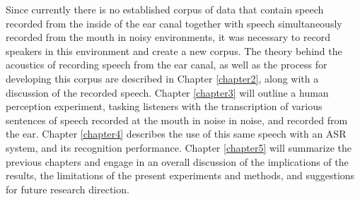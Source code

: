 Since currently there is no established corpus of data that contain speech recorded from the inside of the ear canal together with speech simultaneously recorded from the mouth in noisy environments, it was necessary to record speakers in this environment and create a new corpus.  The theory behind the acoustics of recording speech from the ear canal, as well as the process for developing this corpus are described in Chapter \ref{chapter2}, along with a discussion of the recorded speech.  Chapter \ref{chapter3} will outline a human perception experiment, tasking listeners with the transcription of various sentences of speech recorded at the mouth in noise in noise, and recorded from the ear.   Chapter \ref{chapter4} describes the use of this same speech with an ASR system, and its recognition performance.  Chapter \ref{chapter5} will summarize the previous chapters and engage in an overall discussion of the implications of the results, the limitations of the present experiments and methods, and suggestions for future research direction.



